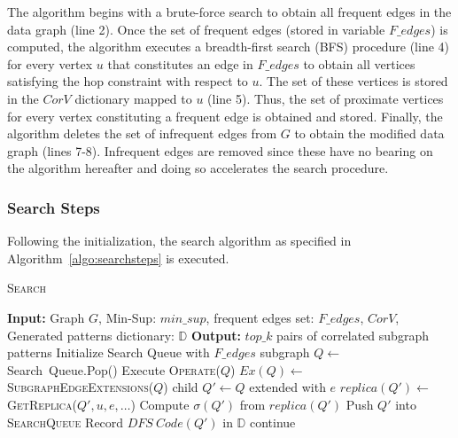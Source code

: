 The algorithm begins with a brute-force search to obtain all frequent edges in
the data graph (line 2). Once the set of frequent edges (stored in variable
$F\_edges$) is computed, the algorithm executes a breadth-first search (BFS)
procedure (line 4) for every vertex $u$ that constitutes an edge in $F\_edges$
to obtain all vertices satisfying the hop constraint with respect to $u$. The
set of these vertices is stored in the $CorV$ dictionary mapped to $u$ (line 5).
Thus, the set of proximate vertices for every vertex constituting a frequent
edge is obtained and stored. Finally, the algorithm deletes the set of
infrequent edges from $G$ to obtain the modified data graph (lines 7-8).
Infrequent edges are removed since these have no bearing on the algorithm
hereafter and doing so accelerates the search procedure.

\subsubsection{Search Steps}
\label{subsec:search-steps}
Following the initialization, the search algorithm as specified in
Algorithm~\ref{algo:searchsteps} is executed.
\begin{algorithm}
	\dontprintsemicolon
	\caption{\textsc{Search}}\label{algo:searchsteps}
	\nonl \textbf{Input:} Graph $G$, {\sf Min-Sup:} $min\_sup$, frequent edges
	set: $F\_edges$, $CorV$, Generated patterns dictionary: $\mathbb{D}$ \;
	\nonl \textbf{Output:} $top\_k$ pairs of correlated subgraph patterns  \;
	Initialize {\sf Search Queue} with $F\_edges$ \; 
	{
		subgraph $Q \leftarrow$ {\sf Search\
		Queue.Pop()}\; 
		Execute \textsc{Operate($Q$)}\; 
		$Ex(Q) \leftarrow $ \textsc{SubgraphEdgeExtensions($Q$)}\; 
		{
			child $Q'\leftarrow Q$ extended with $e$\; 
			{
				$replica(Q') \leftarrow $ \textsc{GetReplica($Q', u, e, \dots$)}\;
				Compute $\sigma(Q')$ from $replica(Q')$\;
				{
					Push $Q'$ into \textsc{SearchQueue}\;
				}
				Record $DFS\ Code(Q')$ in $\mathbb{D}$\;
			}
			\Else
			{
				continue\;
			}
		}
	}
		\;
\end{algorithm}


